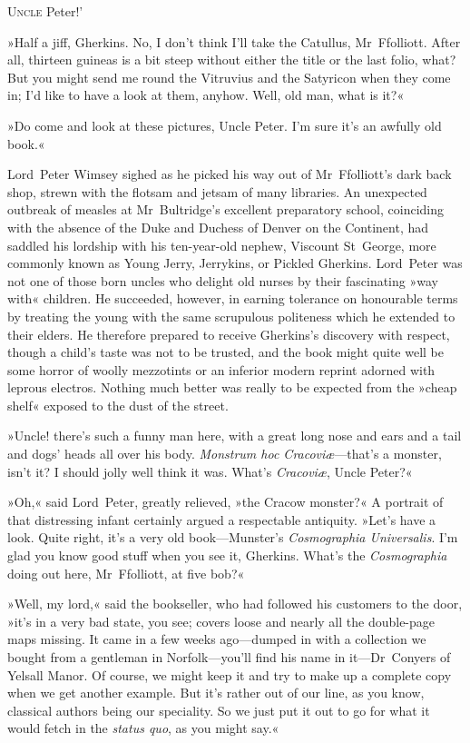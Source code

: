 
\lettrine[lines=4,ante=‘]{U}{ncle} Peter!'

\zz
»Half a jiff, Gherkins. No, I don't think I'll take the Catullus, Mr~Ffolliott. After all, thirteen guineas is a bit steep without either the title or the last folio, what? But you might send me round the Vitruvius and the Satyricon when they come in; I'd like to have a look at them, anyhow. Well, old man, what is it?«

»Do come and look at these pictures, Uncle Peter. I'm sure it's an awfully old book.«

Lord~Peter Wimsey sighed as he picked his way out of Mr~Ffolliott's dark back shop, strewn with the flotsam and jetsam of many libraries. An unexpected outbreak of measles at Mr~Bultridge's excellent preparatory school, coinciding with the absence of the Duke and Duchess of Denver on the Continent, had saddled his lordship with his ten-year-old nephew, Viscount St~George, more commonly known as Young Jerry, Jerrykins, or Pickled Gherkins. Lord~Peter was not one of those born uncles who delight old nurses by their fascinating »way with« children. He succeeded, however, in earning tolerance on honourable terms by treating the young with the same scrupulous politeness which he extended to their elders. He therefore prepared to receive Gherkins's discovery with respect, though a child's taste was not to be trusted, and the book might quite well be some horror of woolly mezzotints or an inferior modern reprint adorned with leprous electros. Nothing much better was really to be expected from the »cheap shelf« exposed to the dust of the street.

»Uncle! there's such a funny man here, with a great long nose and ears and a tail and dogs' heads all over his body. \textit{Monstrum hoc Cracoviæ}—that's a monster, isn't it? I should jolly well think it was. What's \textit{Cracoviæ}, Uncle Peter?«

»Oh,« said Lord~Peter, greatly relieved, »the Cracow monster?« A portrait of that distressing infant certainly argued a respectable antiquity. »Let's have a look. Quite right, it's a very old book—Munster's \textit{Cosmographia Universalis}. I'm glad you know good stuff when you see it, Gherkins. What's the \textit{Cosmographia} doing out here, Mr~Ffolliott, at five bob?«

»Well, my lord,« said the bookseller, who had followed his customers to the door, »it's in a very bad state, you see; covers loose and nearly all the double-page maps missing. It came in a few weeks ago—dumped in with a collection we bought from a gentleman in Norfolk—you'll find his name in it—Dr~Conyers of Yelsall Manor. Of course, we might keep it and try to make up a complete copy when we get another example. But it's rather out of our line, as you know, classical authors being our speciality. So we just put it out to go for what it would fetch in the \textit{status quo}, as you might say.«

